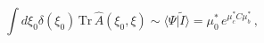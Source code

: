 \begin{equation}
\int d\xi _{0}\delta (\xi _{0})\,\mathrm{Tr}\,\hat{A}(\xi _{0},\xi )\sim
\langle \Psi |\tilde{I}\rangle =\mu _{0}^{\ast }\,e^{\mu _{c}^{\ast }C\mu
_{b}^{\ast }}\,,
\end{equation}

